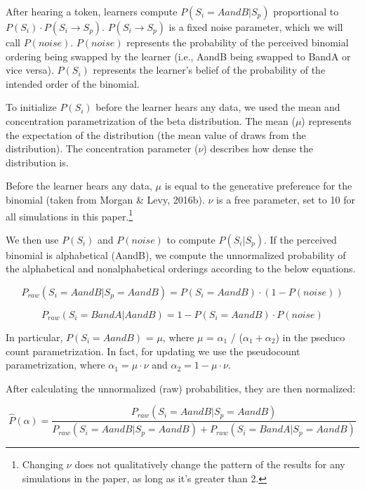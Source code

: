 \documentclass[10pt, letterpaper]{article}
\begin{document}
After hearing a token, learners compute \(P(S_i = AandB|S_p)\)
proportional to \(P(S_i) \cdot P(S_i \to S_p)\). \(P(S_i \to S_p)\) is a
fixed noise parameter, which we will call \(P(noise)\). \(P(noise)\)
represents the probability of the perceived binomial ordering being
swapped by the learner (i.e., AandB being swapped to BandA or vice
versa). \(P(S_i)\) represents the learner's belief of the probability of
the intended order of the binomial.

To initialize \(P(S_i)\) before the learner hears any data, we used the
mean and concentration parametrization of the beta distribution. The
mean (\(\mu\)) represents the expectation of the distribution (the mean
value of draws from the distribution). The concentration parameter
(\(\nu\)) describes how dense the distribution is.

Before the learner hears any data, \(\mu\) is equal to the generative
preference for the binomial (taken from Morgan \& Levy, 2016b). \(\nu\)
is a free parameter, set to 10 for all simulations in this
paper.\footnote{Changing \(\nu\) does not qualitatively change the
  pattern of the results for any simulations in the paper, as long as
  it's greater than 2.}

We then use \(P(S_i)\) and \(P(noise)\) to compute \(P(S_i|S_p)\). If
the perceived binomial is alphabetical (AandB), we compute the
unnormalized probability of the alphabetical and nonalphabetical
orderings according to the below equations.

\begin{equation}
\label{eq:praw}
P_{raw}(S_i = AandB|S_p = AandB) = P(S_i = AandB) \cdot (1 -  P(noise))
\end{equation}

\begin{equation}
\label{eqprawtwo}
P_{raw}(S_i = BandA|AandB) = 1 - P(S_i = AandB) \cdot P(noise)
\end{equation}

In particular, \(P(S_i = AandB)\) = \(\mu\), where \(\mu\) =
\(\alpha_1\) / (\(\alpha_1 + \alpha_2\)) in the pseduco count
parametrization. In fact, for updating we use the pseudocount
parametrization, where \(\alpha_1 = \mu \cdot \nu\) and
\(\alpha_2 = 1-\mu \cdot \nu\).

After calculating the unnormalized (raw) probabilities, they are then
normalized:

\begin{equation}
\label{eq:phatalpha}
\hat{P}(\alpha) = \frac{P_{raw}(S_i = AandB|S_p = AandB)}{P_{raw}(S_i = AandB | S_p = AandB) + P_{raw}(S_i = BandA|S_p = AandB)}
\end{equation}
\end{document}
